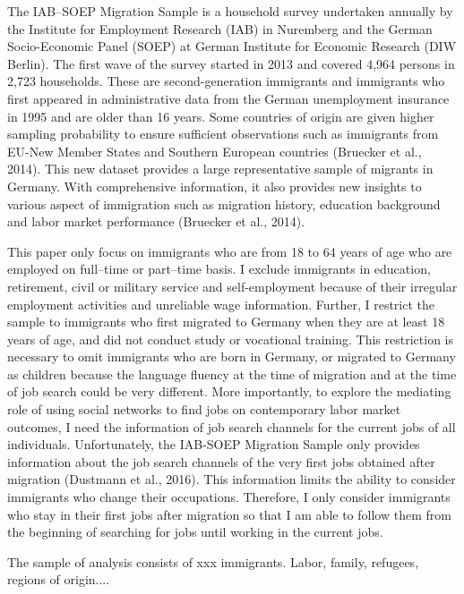 \documentclass[12pt,a4paper]{article}
\begin{document}
The IAB--SOEP Migration Sample is a household survey undertaken annually by the Institute for Employment Research (IAB) in Nuremberg and the German Socio-Economic Panel (SOEP) at German Institute for Economic Research (DIW Berlin). The first wave of the survey started in 2013 and covered 4,964 persons in 2,723 households. These are second-generation immigrants and immigrants who first appeared in administrative data from the German unemployment insurance in 1995 and are older than 16 years. Some countries of origin are given higher sampling probability to ensure sufficient observations such as immigrants from EU-New Member States and Southern European countries (Bruecker et al., 2014). This new dataset provides a large representative sample of migrants in Germany. With comprehensive information, it also provides new insights to various aspect of immigration such as migration history, education background and labor market performance (Bruecker et al., 2014).

This paper only focus on immigrants who are from 18 to 64 years of age who are employed on full--time or part--time basis. I exclude immigrants in education, retirement, civil or military service and self-employment because of their irregular employment activities and unreliable wage information. Further, I restrict the sample to immigrants who first migrated to Germany when they are at least 18 years of age, and did not conduct study or vocational training. This restriction is necessary to omit immigrants who are born in Germany, or migrated to Germany as children because the language fluency at the time of migration and at the time of job search could be very different. More importantly, to explore the mediating role of using social networks to find jobs on contemporary labor market outcomes, I need the information of job search channels for the current jobs of all individuals. Unfortunately, the IAB-SOEP Migration Sample only provides information about the job search channels of the very first jobs obtained after migration (Dustmann et al., 2016). This information limits the ability to consider immigrants who change their occupations. Therefore, I only consider immigrants who stay in their first jobs after migration so that I am able to follow them from the beginning of searching for jobs until working in the current jobs. 

The sample of analysis consists of xxx immigrants. Labor, family, refugees, regions of origin....%
\end{document}
